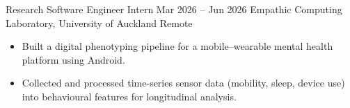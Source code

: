 \CVExperienceEntry
  {Research Software Engineer Intern}
  {Mar 2026 -- Jun 2026}
  {Empathic Computing Laboratory, University of Auckland}
  {Remote}
\begin{itemize}[leftmargin=*, itemsep=0.35em]
  \item Built a digital phenotyping pipeline for a mobile–wearable mental health platform using Android.
  \item Collected and processed time-series sensor data (mobility, sleep, device use) into behavioural features for longitudinal analysis.
\end{itemize}
